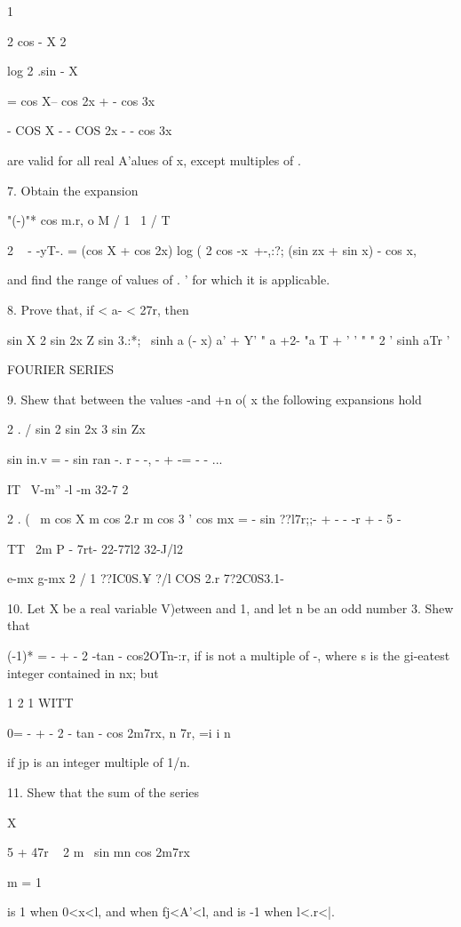1

2 cos - X 2

log 2 .sin - X

= cos X-- cos 2x + - cos 3x

- COS X - - COS 2x - - cos 3x

are valid for all real A'alues of x, except multiples of \pi.

7. Obtain the expansion

"(-)"* cos m.r, o M / 1 \ 1 /  T  \

2 ~ - -yT-. = (cos X + cos 2x) log ( 2 cos -x\ +-,:?; (sin zx + sin x)
- cos x,

and find the range of values of . ' for which it is applicable.

8. Prove that, if < a- < 27r, then

sin X 2 sin 2x Z sin 3.:*; \ \pi sinh a (\pi - x) a' + Y' " a +2- "a T +
' ' " " 2 ' sinh aTr '


FOURIER SERIES

%
%

9. Shew that between the values -\pi and +n o( x the following
expansions hold

2 . / sin 2 sin 2x 3 sin Zx

sin in.v = - sin ran -. r - -, - + -= - - ...

IT \ V-m'' -l -m 32-7 2

2 . ( \ m cos X m cos 2.r m cos 3 ' cos mx = - sin ??l7r;;- + - - -r
+ - 5 -

TT \ 2m P - 7rt- 22-77l2 32-J/l2

e-mx g-mx 2 / 1 ??IC0S.¥ ?/l COS 2.r 7?2C0S3.1- \

10. Let X be a real variable V)etween and 1, and let n be an odd
number 3. Shew that

(-1)* = - + - 2 -tan - cos2OTn-:r, if is not a multiple of -, where s
is the gi-eatest integer contained in nx; but

 1 2 1 WITT

0= - + - 2 - tan - cos 2m7rx, n 7r, =i i n

if jp is an integer multiple of 1/n. 

11. Shew that the sum of the series

X

 5 + 47r ~ 2 m~ sin mn cos 2m7rx

m = 1

is 1 when 0<x<l, and when fj<A'<l, and is -1 when l<.r<|.

